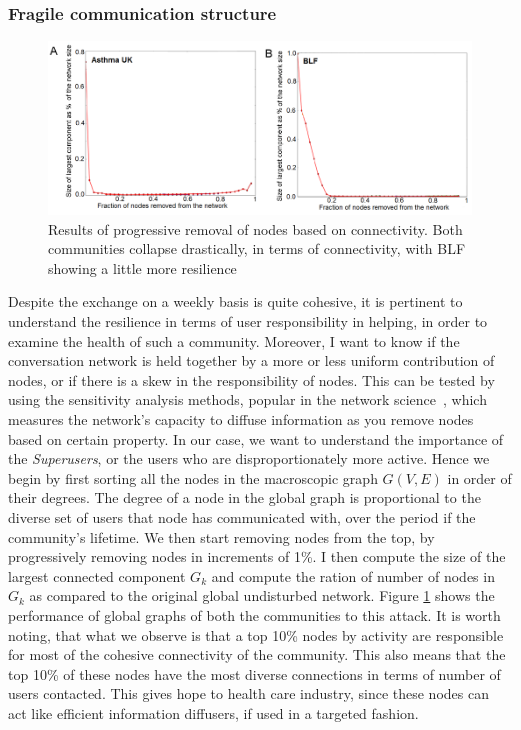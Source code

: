 \subsubsection{Fragile communication structure}
\label{sec:fragility}
\begin{figure}[!ht]
    \includegraphics[width=\textwidth]{jmirSensitivity.png}
    \caption{Results of progressive removal of nodes based on connectivity. Both communities collapse drastically, in terms of connectivity, with BLF showing a little more resilience }
    \label{fig:sense_asthma}
\end{figure}
Despite the exchange on a weekly basis is quite cohesive, it is pertinent to understand the resilience in terms of user responsibility in helping, in order to examine the health of such a community. Moreover, I want to know if the conversation network is held together by a more or less uniform contribution of nodes, or if there is a skew in the responsibility of nodes. 
This can be tested by using the sensitivity analysis methods, popular in the network science~\cite{braunstein2016network,albert2000error}, which measures the network's capacity to diffuse information as you remove nodes based on certain property. In our case, we want to understand the importance of the \textsl{Superusers}, or the users who are disproportionately more active. Hence we begin by first sorting all the nodes in the macroscopic graph $G(V,E)$ in order of their degrees. The degree of a node in the global graph is proportional to the diverse set of users that node has communicated with, over the period if the community's lifetime. We then start removing nodes from the top, by progressively removing nodes in increments of 1\%. I then compute the size of the largest connected component $G_k$ and compute the ration of number of nodes in $G_k$ as compared to the original global undisturbed network.  Figure \ref{fig:sense_asthma} shows the performance of global graphs of both the communities to this attack. It is worth noting, that what we observe is that a top 10\% nodes by activity are responsible for most of the cohesive connectivity of the community. This also means that the top 10\% of these nodes have the most diverse connections in terms of number of users contacted. This gives hope to health care industry, since these nodes can act like efficient information diffusers, if used in a targeted fashion. 

